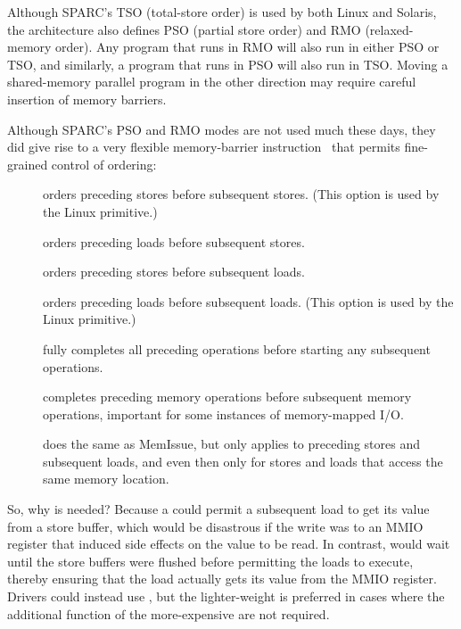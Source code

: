Although SPARC's TSO (total-store order) is used by both Linux and
Solaris, the architecture also defines PSO (partial store order) and RMO
(relaxed-memory order).
Any program that runs in RMO will also run in either PSO or TSO, and similarly,
a program that runs in PSO will also run in TSO\@.
Moving a shared-memory parallel program in the other direction may
require careful insertion of memory barriers.

Although SPARC's PSO and RMO modes are not used much these days, they
did give rise to a very flexible memory-barrier instruction~\cite{SPARC94}
that permits fine-grained control of ordering:
\begin{description}
\item	[] orders preceding stores before subsequent stores.
	(This option is used by the Linux  primitive.)
\item	[] orders preceding loads before subsequent stores.
\item	[] orders preceding stores before subsequent loads.
\item	[] orders preceding loads before subsequent loads.
	(This option is used by the Linux  primitive.)
\item	[] fully completes all preceding operations before starting
	any subsequent operations.
\item	[] completes preceding memory operations before subsequent
	memory operations, important for some instances of memory-mapped
	I/O.
\item	[] does the same as MemIssue,
	but only applies to preceding stores
	and subsequent loads, and even then only for stores and loads that
	access the same memory location.
\end{description}

So, why is  needed?
Because a  could permit a subsequent
load to get its value from a store buffer, which would be
disastrous if the write was to an MMIO register that induced side effects
on the value to be read.
In contrast,  would wait until the store buffers
were flushed before permitting the loads to execute,
thereby ensuring that the load actually gets its value from the MMIO register.
Drivers could instead use , but the lighter-weight
 is preferred in cases where the additional function
of the more-expensive  are not required.

